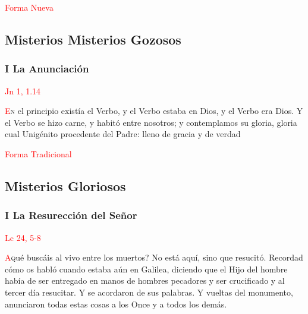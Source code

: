 \documentclass[10pt,twoside]{book}
\begin{document}
\begin{paracol}{2}
      \begin{leftcolumn}
            \begin{center}
                  \textcolor{red}{Forma Nueva}
                  \subsection*{Misterios Misterios Gozosos}
            \end{center}

            \noindent\subsubsection*{I La Anunciación}

            \vspace{-0.5em}

            \hfill\textcolor{red}{Jn 1, 1.14}

            \lettrine[lines=2]{\textcolor{red}{E}}n el principio existía el Verbo, y el Verbo estaba en Dios, y el Verbo era Dios. Y el Verbo se hizo
            carne, y habitó entre nosotros; y contemplamos su gloria, gloria cual Unigénito procedente del Padre: lleno de gracia y de verdad

      \end{leftcolumn}
      \begin{rightcolumn}
            \begin{center}
                  \textcolor{red}{Forma Tradicional}
                  \subsection*{Misterios Gloriosos}
            \end{center}

            \noindent\subsubsection*{I La Resurección del Señor}

            \vspace{-0.5em}

            \hfill\textcolor{red}{Lc 24, 5-8}

            \lettrine[lines=2, ante={?`}]{\textcolor{red}{A}} qué buscáis al vivo entre los muertos? No está aquí, sino que resucitó. Recordad cómo
            os habló cuando estaba aún en Galilea, diciendo que el Hijo del hombre había de ser entregado en manos de hombres pecadores y ser crucificado
            y al tercer día resucitar. Y se acordaron de sus palabras. Y vueltas del monumento, anunciaron todas estas cosas a los Once y a todos los demás.

      \end{rightcolumn}
\end{paracol}
\end{document}
